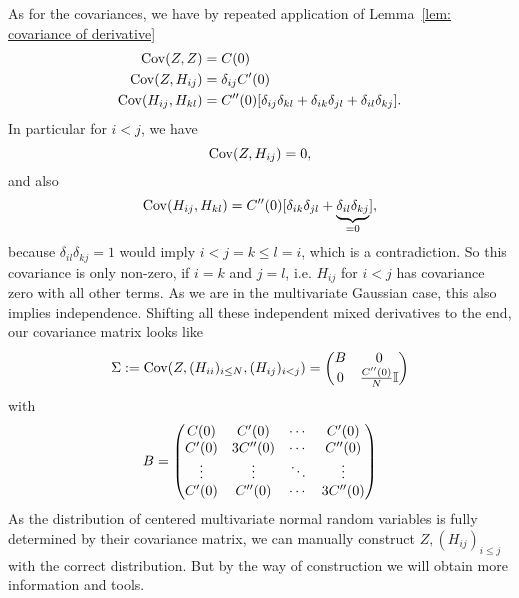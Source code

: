 As for the covariances, we have by repeated application of Lemma~\ref{lem:
covariance of derivative}
\begin{align*}
	\operatorname{Cov}(Z,Z) &= C(0)\\
	\operatorname{Cov}(Z, H_{ij}) &= \delta_{ij} C'(0)\\
	\operatorname{Cov}(H_{ij}, H_{kl}) &= C''(0)
	[\delta_{ij}\delta_{kl} + \delta_{ik}\delta_{jl} + \delta_{il}\delta_{kj}].
\end{align*}
In particular for \(i<j\), we have
\[
	\operatorname{Cov}(Z, H_{ij}) = 0,
\]
and also
\[
	\operatorname{Cov}(H_{ij}, H_{kl}) = C''(0)
	[\delta_{ik}\delta_{jl} + \underbrace{\delta_{il}\delta_{kj}}_{=0}],
\]
because \(\delta_{il}\delta_{kj}=1\) would imply \(i < j = k \le l = i\), which
is a contradiction. So this covariance is only non-zero, if \(i=k\) and \(j=l\),
i.e. \(H_{ij}\) for \(i<j\) has covariance zero with all other terms.
As we are in the multivariate Gaussian case, this also implies independence.
Shifting all these independent mixed derivatives to the end, our covariance
matrix looks like
\[
	\Sigma := \operatorname{Cov}(Z, (H_{ii})_{i\le N}, (H_{ij})_{i<j})
	= \begin{pmatrix}
		B & 0\\
		0 & \frac{C''(0)}{N}\mathbb{I}
	\end{pmatrix}
\]
with
\[
	B = \begin{pmatrix}
		C(0) & C'(0)	& \cdots & C'(0) \\
		C'(0) & 3C''(0) &  \cdots & C''(0) \\
		\vdots & \vdots & \ddots & \vdots \\
		C'(0) & C''(0) & \cdots &  3 C''(0)
	\end{pmatrix}
\]
As the distribution of centered multivariate normal random variables is fully
determined by their covariance matrix, we can manually construct
\(Z,(H_{ij})_{i\le j}\) with the correct distribution. But by the way of
construction we will obtain more information and tools.

